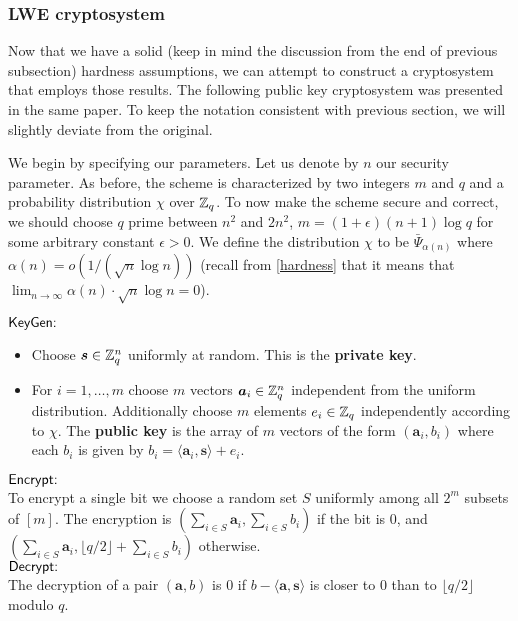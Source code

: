 \subsubsection*{LWE cryptosystem}
Now that we have a solid (keep in mind the discussion from the end of previous subsection) hardness assumptions, we can attempt to construct a cryptosystem that employs those results. The following public key cryptosystem was presented in the same paper. To keep the notation consistent with previous section, we will slightly deviate from the original.

We begin by specifying our parameters. Let us denote by $n$ our security parameter. As before, the scheme is characterized by two integers $m$ and $q$ and a probability distribution $\chi$ over $\mathbb{Z}_q$. To now make the scheme secure and correct, we should choose $q$ prime between $n^2$ and $2n^2$, $m = (1 + \epsilon)(n + 1) \log q$ for some arbitrary constant $\epsilon > 0$. We define the distribution $\chi$ to be $\bar{\Psi}_{\alpha (n)}$ where $\alpha (n) = o(1/(\sqrt{n} \log n))$ (recall from \ref{hardness} that it means that $\lim_{n\to\infty} \alpha (n) \cdot \sqrt{n} \log n = 0$).\\

\begin{mdframed}
$\alg{KeyGen:}$
\begin{itemize}
    \item Choose $\boldsymbol{s} \in \mathbb{Z}^n_q$ uniformly at random. This is the \textbf{private key}.
    \item For $i = 1, \dots, m$ choose $m$ vectors $\boldsymbol{a}_i \in \mathbb{Z}^n_q$ independent from the uniform distribution. Additionally choose $m$ elements $e_i \in \mathbb{Z}_q$ independently according to $\chi$. The \textbf{public key} is the array of $m$ vectors of the form $(\bm{a}_i, b_i)$ where each $b_i$ is given by $b_i = \langle \bm{a}_i, \bm{s} \rangle + e_i$.
\end{itemize}
$\alg{Encrypt:}$\\
To encrypt a single bit we choose a random set $S$ uniformly among all $2^m$ subsets of $[m]$. The encryption is $(\sum_{i \in S} \bm{a}_i, \sum_{i \in S} b_i)$ if the bit is 0, and $(\sum_{i \in S} \bm{a}_i, \lfloor q/2 \rfloor + \sum_{i \in S} b_i)$ otherwise. \\
$\alg{Decrypt:}$\\
The decryption of a pair $(\bm{a}, b)$ is 0 if $b - \langle \bm{a}, \bm{s} \rangle$ is closer to 0 than to $\lfloor q/2 \rfloor$ modulo $q$.
\end{mdframed}

